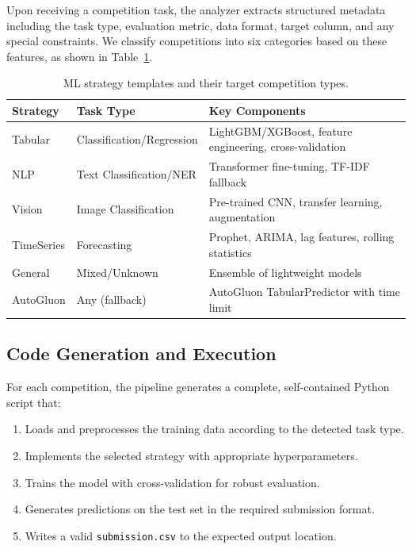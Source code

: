 \documentclass[11pt]{article}
\begin{document}
Upon receiving a competition task, the analyzer extracts structured metadata including the task type, evaluation metric, data format, target column, and any special constraints. We classify competitions into six categories based on these features, as shown in Table~\ref{tab:strategies}.

\begin{table}[t]
\centering
\caption{ML strategy templates and their target competition types.}
\label{tab:strategies}
\begin{tabular}{@{}llp{5.2cm}@{}}
\toprule
\textbf{Strategy} & \textbf{Task Type} & \textbf{Key Components} \\
\midrule
Tabular     & Classification/Regression & LightGBM/XGBoost, feature engineering, cross-validation \\
NLP         & Text Classification/NER   & Transformer fine-tuning, TF-IDF fallback \\
Vision      & Image Classification      & Pre-trained CNN, transfer learning, augmentation \\
TimeSeries  & Forecasting              & Prophet, ARIMA, lag features, rolling statistics \\
General     & Mixed/Unknown             & Ensemble of lightweight models \\
AutoGluon   & Any (fallback)            & AutoGluon TabularPredictor with time limit \\
\bottomrule
\end{tabular}
\end{table}

\subsection{Code Generation and Execution}

For each competition, the pipeline generates a complete, self-contained Python script that:
\begin{enumerate}[leftmargin=*,itemsep=1pt]
  \item Loads and preprocesses the training data according to the detected task type.
  \item Implements the selected strategy with appropriate hyperparameters.
  \item Trains the model with cross-validation for robust evaluation.
  \item Generates predictions on the test set in the required submission format.
  \item Writes a valid \texttt{submission.csv} to the expected output location.
\end{enumerate}
\end{document}
